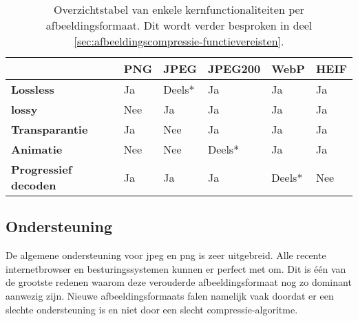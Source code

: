 \begin{table}[]
	\begin{tabular}{|l|l|l|l|l|l|}
		\hline
		& \textbf{PNG}                   & \textbf{JPEG}                  & \textbf{JPEG200}               & \textbf{WebP}                  & \textbf{HEIF}               \\ \hline
		\textbf{Lossless}            & \cellcolor[HTML]{32CB00}Ja     & \cellcolor[HTML]{CB0000}Deels* & \cellcolor[HTML]{32CB00}Ja     & \cellcolor[HTML]{32CB00}Ja     & \cellcolor[HTML]{32CB00}Ja  \\ \hline
		\textbf{lossy}               & \cellcolor[HTML]{CB0000}Nee    & \cellcolor[HTML]{32CB00}Ja     & \cellcolor[HTML]{32CB00}Ja     & \cellcolor[HTML]{32CB00}Ja     & \cellcolor[HTML]{32CB00}Ja  \\ \hline
		\textbf{Transparantie}       & \cellcolor[HTML]{32CB00}Ja     & \cellcolor[HTML]{CB0000}Nee    & \cellcolor[HTML]{32CB00}Ja     & \cellcolor[HTML]{32CB00}Ja     & \cellcolor[HTML]{32CB00}Ja  \\ \hline
		\textbf{Animatie}            & \cellcolor[HTML]{CB0000}Nee  & \cellcolor[HTML]{CB0000}Nee    & \cellcolor[HTML]{9B9B9B}Deels* & \cellcolor[HTML]{32CB00}Ja     & \cellcolor[HTML]{32CB00}Ja  \\ \hline
		\textbf{Progressief decoden} & \cellcolor[HTML]{32CB00}Ja     & \cellcolor[HTML]{32CB00}Ja     & \cellcolor[HTML]{32CB00}Ja     & \cellcolor[HTML]{9B9B9B}Deels* & \cellcolor[HTML]{CB0000}Nee \\ \hline
	\end{tabular}
	\caption{Overzichtstabel van enkele kernfunctionaliteiten per \gls{afbeeldingsformaat}. Dit wordt verder besproken in deel \ref{sec:afbeeldingscompressie-functievereisten}.}
	\label{fig:overzichtstabel-afbeeldingsformaten-functies}
\end{table}

\subsection{Ondersteuning}
\label{sec:afbeeldingscompressie-ondersteuning}

De algemene ondersteuning voor \gls{jpeg} en \gls{png} is zeer uitgebreid. Alle recente internetbrowser en besturingssystemen kunnen er perfect met om. Dit is één van de grootste redenen waarom deze verouderde \gls{afbeeldingsformaat} nog zo dominant aanwezig zijn. Nieuwe \glspl{afbeeldingsformaat} falen namelijk vaak doordat er een slechte ondersteuning is en niet door een slecht \gls{compressie-algoritme}.

